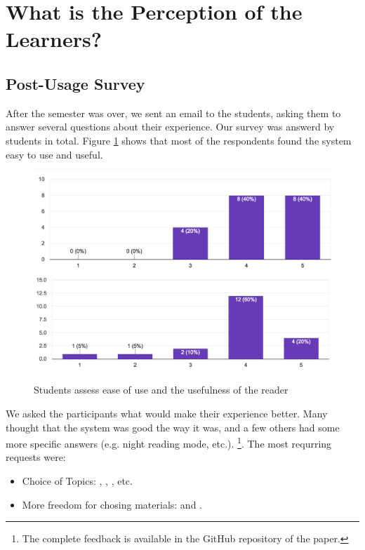
\newpage
\section{What is the Perception of the Learners?}
\label{sec:perception}

\subsection{Post-Usage Survey}

After the semester was over, we sent an email to the students, asking them to answer several questions about their experience. Our survey was answerd by \surveyrespondents students in total. Figure \ref{fig:reader_use} shows that most of the respondents found the system easy to use and useful. 

 \begin{figure}[h!]
    \centering
      \includegraphics[width=0.8\columnwidth]{figures/opinions/reader_ease_of_use}
      \includegraphics[width=0.8\columnwidth]{figures/opinions/reader_usefulness}
      \caption{Students assess ease of use and the usefulness of the reader}
      \label{fig:reader_use}
    \end{figure}

We asked the participants what would make their experience better. Many thought that the system was good the way it was, and a few others had some more specific answers (e.g. night reading mode, etc.). \footnote{The complete feedback is available in the GitHub repository of the paper.}. The most requrring requests were: 

\begin{itemize}
	\item Choice of Topics: 
		, 
		, 
		, etc.
	\item More freedom for chosing materials: 
		 and 
		. 
\end{itemize}

